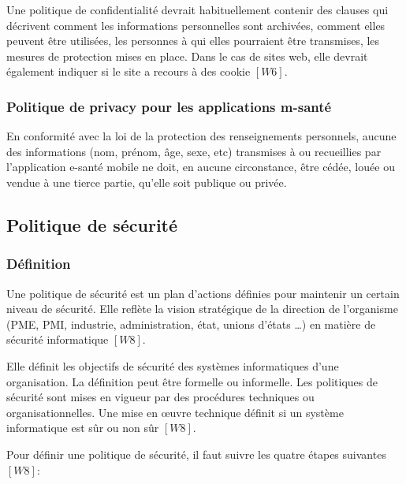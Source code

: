 \vspace{6pt}
\paragraphmark

Une politique de confidentialité devrait habituellement contenir des clauses qui décrivent comment les informations personnelles sont archivées, comment elles peuvent être utilisées, les personnes à qui elles pourraient être transmises, les mesures de protection mises en place. Dans le cas de sites web, elle devrait également indiquer si le site a recours à des cookie $[W6]$.

\subsubsection{Politique de privacy pour les applications m-santé}

En conformité avec la loi de la protection des renseignements personnels, aucune des informations (nom, prénom, âge, sexe, etc) transmises à ou recueillies par l'application e-santé mobile ne doit, en aucune circonstance, être cédée, louée ou vendue à une tierce partie, qu’elle soit publique ou privée.

\subsection{Politique de sécurité}

\subsubsection{Définition}

Une politique de sécurité est un plan d'actions définies pour maintenir un certain niveau de sécurité. Elle reflète la vision stratégique de la direction de l'organisme (PME, PMI, industrie, administration, état, unions d'états …) en matière de sécurité informatique $[W8]$.

\vspace{6pt}
\paragraphmark

Elle définit les objectifs de sécurité des systèmes informatiques d'une organisation. La définition peut être formelle ou informelle. Les politiques de sécurité sont mises en vigueur par des procédures techniques ou organisationnelles. Une mise en œuvre technique définit si un système informatique est sûr ou non sûr $[W8]$.

\vspace{6pt}
\paragraphmark

Pour définir une politique de sécurité, il faut suivre les quatre étapes suivantes $[W8]$:

